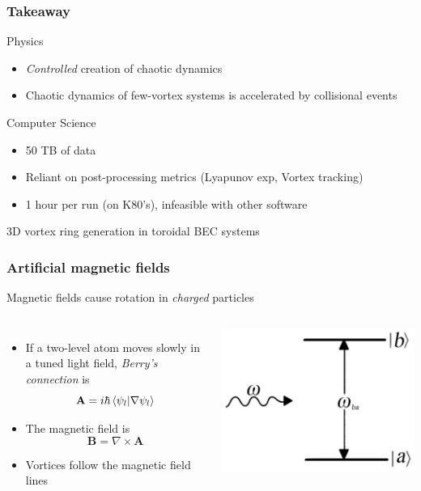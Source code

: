 \documentclass{beamer}
\begin{document}
\begin{frame}
\frametitle{Takeaway}
Physics
\begin{itemize}
\item \textit{Controlled} creation of chaotic dynamics
\item Chaotic dynamics of few-vortex systems is accelerated by collisional events
\end{itemize}
Computer Science
\begin{itemize}
\item 50 TB of data
\item Reliant on post-processing metrics (Lyapunov exp, Vortex tracking)
\item 1 hour per run (on K80's), infeasible with other software
\end{itemize}
\end{frame}

\begin{frame}
\center \huge 3D vortex ring generation in toroidal BEC systems
\end{frame}

\begin{frame}
\frametitle{Artificial magnetic fields}
\begin{center}
Magnetic fields cause rotation in \textit{charged} particles
\end{center}
\begin{columns}
\begin{itemize}
\item If a two-level atom moves slowly in a tuned light field, \textit{Berry's connection} is
$$
\mathbf{A} = i\hbar\braket{\psi_l | \nabla\psi_l}
$$
\item The magnetic field is
$$
\mathbf{B} = \nabla \times \mathbf{A}
$$
\item Vortices follow the magnetic field lines
\end{itemize}
\includegraphics[width=\textwidth]{2level.jpg}
\end{columns}
\end{frame}
\end{document}
